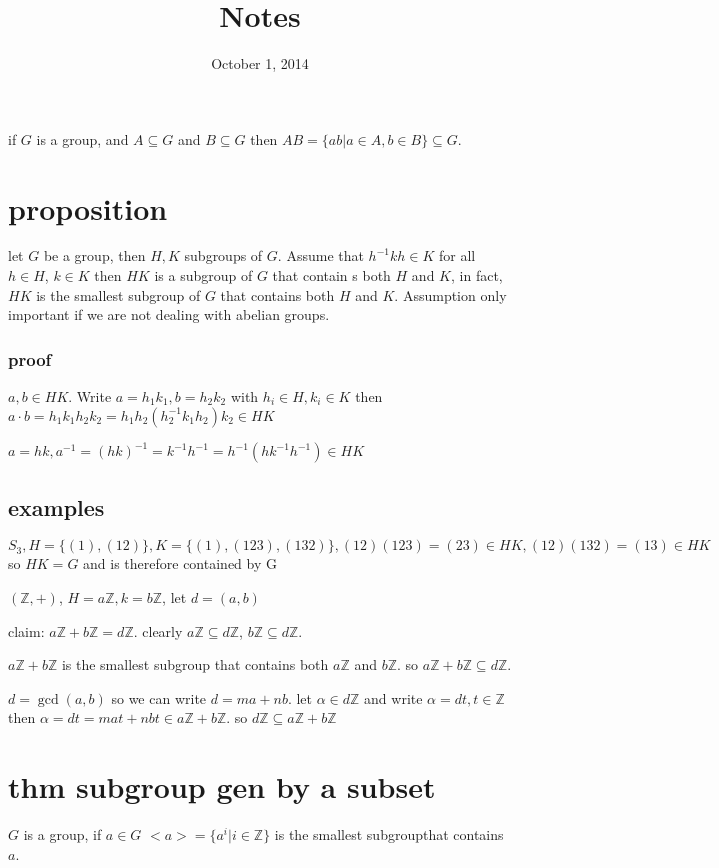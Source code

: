 \documentclass[letterpaper]{article}
\begin{document}
\title{Notes}
\date{October 1, 2014}
\maketitle
if $G$ is a group, and $A\subseteq G$ and $B\subseteq G$ then $AB=\{ab|a\in A, b\in B\}\subseteq G$.

\section*{proposition}

let $G$ be a group, then $H,K$ subgroups of $G$. Assume that $h^{-1}kh\in K$ for all $h\in H$, $k\in K$ then $HK$ is a subgroup of $G$ that contain s both $H$ and $K$, in fact, $HK$ is the smallest subgroup of $G$ that contains both $H$ and $K$. Assumption only important if we are not dealing with abelian groups.

\subsubsection*{proof}
$a,b\in HK$. Write $a=h_1k_1,b=h_2k_2$ with $h_i\in H,k_i\in K$ then $a\cdot b=h_1k_1h_2k_2=h_1h_2(h_2^{-1}k_1h_2)k_2\in HK$

$a=hk, a^{-1}=(hk)^{-1}=k^{-1}h^{-1}=h^{-1}(hk^{-1}h^{-1})\in HK$

\subsection*{examples}
$S_3, H=\{(1),(12)\}, K=\{(1),(123),(132)\}, (12)(123)=(23)\in HK, (12)(132)=(13)\in HK$ so $HK=G$ and is therefore contained by G

$(\mathbb{Z},+)$, $H=a\mathbb{Z}, k=b\mathbb{Z}$, let $d=(a,b)$

claim: $a\mathbb{Z}+b\mathbb{Z}=d\mathbb{Z}$. clearly $a\mathbb{Z}\subseteq d\mathbb{Z}$, $b\mathbb{Z}\subseteq d\mathbb{Z}$. 

$a\mathbb{Z}+b\mathbb{Z}$ is the smallest subgroup that contains both $a\mathbb{Z}$ and $b\mathbb{Z}$. so $a\mathbb{Z}+b\mathbb{Z}\subseteq d\mathbb{Z}$.

$d=\gcd(a,b)$ so we can write $d=ma+nb$. let $\alpha\in d\mathbb{Z}$ and write $\alpha=dt, t\in \mathbb{Z}$ then $\alpha=dt=mat+nbt\in a\mathbb{Z}+b\mathbb{Z}$. so $d\mathbb{Z}\subseteq a\mathbb{Z}+b\mathbb{Z}$ 
\section*{thm subgroup gen by a subset}
$G$ is a group, if $a\in G$ $<a>=\{a^i|i\in \mathbb{Z}\}$ is the smallest subgroupthat contains $a$.
\end{document}
